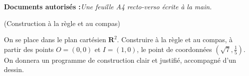 \documentclass[a4paper,12pt,reqno]{amsart}
\begin{document}
\ifsolutions\else
  \textbf{Documents autorisés :}\textit{Une feuille A4 recto-verso écrite à la main.}

  \vspace{7mm}
  \tsvp
\fi


\begin{exo}[.7] (Construction à la règle et au compas)

  On se place dans le plan cartésien $\mathbf{R}^2$. Construire à la règle et au compas, à partir des points $O=(0,0)$ et $I=(1,0)$, le point de coordonnées $\displaystyle{(\sqrt{7}, \frac{1}{5})}$. On donnera un programme de construction clair et justifié, accompagné d'un dessin.
\end{exo}
\end{document}
